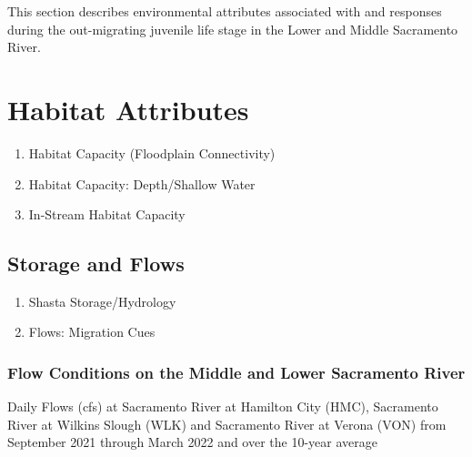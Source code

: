 \documentclass[
]{book}
\theoremstyle{definition}
\theoremstyle{definition}
\theoremstyle{definition}
\theoremstyle{definition}
\theoremstyle{remark}
\begin{document}
This section describes environmental attributes associated with and responses during the out-migrating juvenile life stage in the Lower and Middle Sacramento River.

\hypertarget{habitat-attributes-2}{%
\section{Habitat Attributes}\label{habitat-attributes-2}}

\begin{enumerate}
\def\labelenumi{\arabic{enumi}.}
\item
  Habitat Capacity (Floodplain Connectivity)
\item
  Habitat Capacity: Depth/Shallow Water
\item
  In-Stream Habitat Capacity
\end{enumerate}

\hypertarget{storage-and-flows}{%
\subsection{Storage and Flows}\label{storage-and-flows}}

\begin{enumerate}
\def\labelenumi{\arabic{enumi}.}
\item
  Shasta Storage/Hydrology
\item
  Flows: Migration Cues
\end{enumerate}

\hypertarget{flow-conditions-on-the-middle-and-lower-sacramento-river}{%
\subsubsection{Flow Conditions on the Middle and Lower Sacramento River}\label{flow-conditions-on-the-middle-and-lower-sacramento-river}}

\label{fig:HMCWLKVONflow-fig}Daily Flows (cfs) at Sacramento River at Hamilton City (HMC), Sacramento River at Wilkins Slough (WLK) and Sacramento River at Verona (VON) from September 2021 through March 2022 and over the 10-year average
\end{document}
